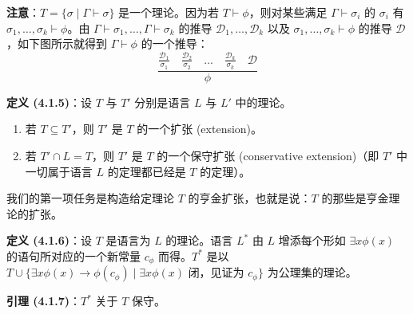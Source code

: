 \documentclass[12pt, a4paper]{article}
\begin{document}
\textbf{注意}：\(T = \{\sigma \mid \Gamma \vdash \sigma\}\) 是一个理论。因为若 \(T \vdash \phi\)，则对某些满足 \(\Gamma \vdash \sigma_i\) 的 \(\sigma_i\) 有 \(\sigma_1, \dots, \sigma_k \vdash \phi\)。由 \(\Gamma \vdash \sigma_1, \dots, \Gamma \vdash \sigma_k\) 的推导 \(\mathcal{D}_1, \dots, \mathcal{D}_k\) 以及 \(\sigma_1, \dots, \sigma_k \vdash \phi\) 的推导 \(\mathcal{D}\)，如下图所示就得到 \(\Gamma \vdash \phi\) 的一个推导：
\[
\frac{
    \frac{\mathcal{D}_1}{\sigma_1} \quad \frac{\mathcal{D}_2}{\sigma_2} \quad \dots \quad \frac{\mathcal{D}_k}{\sigma_k} \quad \mathcal{D}
}{\phi}
\]
\newpage
\begin{mdframed}
\textbf{定义 (4.1.5)}：设 \(T\) 与 \(T'\) 分别是语言 \(L\) 与 \(L'\) 中的理论。
\begin{enumerate}
    \item[(i)] 若 \(T \subseteq T'\)，则 \(T'\) 是 \(T\) 的一个扩张 (extension)。
    \item[(ii)] 若 \(T' \cap L = T\)，则 \(T'\) 是 \(T\) 的一个保守扩张 (conservative extension)（即 \(T'\) 中一切属于语言 \(L\) 的定理都已经是 \(T\) 的定理）。
\end{enumerate}
\end{mdframed}

我们的第一项任务是构造给定理论 \(T\) 的亨金扩张，也就是说：\(T\) 的那些是亨金理论的扩张。

\begin{mdframed}
\textbf{定义 (4.1.6)}：设 \(T\) 是语言为 \(L\) 的理论。语言 \(L^*\) 由 \(L\) 增添每个形如 \(\exists x \phi(x)\) 的语句所对应的一个新常量 \(c_\phi\) 而得。\(T^*\) 是以 \(T \cup \{\exists x \phi(x) \to \phi(c_\phi) \mid \exists x \phi(x) \text{ 闭，见证为 } c_\phi\}\) 为公理集的理论。
\end{mdframed}

\begin{mdframed}
\textbf{引理 (4.1.7)}：\(T^*\) 关于 \(T\) 保守。
\end{mdframed}
\end{document}
